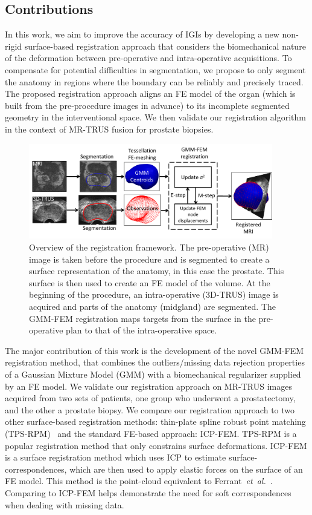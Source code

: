 \documentclass[journal]{IEEEtran}
\begin{document}
\subsection{Contributions}
In this work, we aim to improve the accuracy of IGIs by developing a new non-rigid surface-based registration approach that considers the biomechanical nature of the deformation between pre-operative and intra-operative acquisitions. To compensate for potential difficulties in segmentation, we propose to only segment the anatomy in regions where the boundary can be reliably and precisely traced. The proposed registration approach aligns an FE model of the organ (which is built from the pre-procedure images in advance) to its incomplete segmented geometry in the interventional space. We then validate our registration algorithm in the context of MR-TRUS fusion for prostate biopsies.

\begin{figure}[t]
\center
\includegraphics[width = 0.95\textwidth]{flow1}
\caption{Overview of the registration framework. The pre-operative (MR) image is taken before the procedure and is segmented to create a surface representation of the anatomy, in this case the prostate. This surface is then used to create an FE model of the volume. At the beginning of the procedure, an intra-operative (3D-TRUS) image is acquired and parts of the anatomy (midgland) are segmented. The GMM-FEM registration maps targets from the surface in the pre-operative plan to that of the intra-operative space.}
\label{fig:flowchart}
\end{figure}

The major contribution of this work is the development of the novel GMM-FEM registration method, that combines the outliers/missing data rejection properties of a Gaussian Mixture Model (GMM) with a biomechanical regularizer supplied by an FE model. We validate our registration approach on MR-TRUS images acquired from two sets of patients, one group who underwent a prostatectomy, and the other a prostate biopsy. We compare our registration approach to two other surface-based registration methods: thin-plate spline robust point matching (TPS-RPM)~\cite{Chui03a} and the standard FE-based approach: ICP-FEM. TPS-RPM is a popular registration method that only constrains surface deformations. ICP-FEM is a surface registration method which uses ICP to estimate surface-correspondences, which are then used to apply elastic forces on the surface of an FE model. This method is the point-cloud equivalent to Ferrant~\textit{et~al.}~\cite{Ferrant01a}. Comparing to ICP-FEM helps demonstrate the need for soft correspondences when dealing with missing data.
\end{document}
